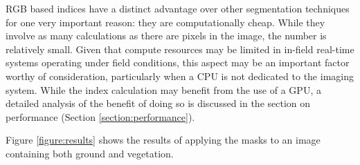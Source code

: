 \documentclass[letterpaper, notitlepage]{report}
\begin{document}
{RGB based indices have a distinct advantage over other segmentation techniques for one very important reason: they are computationally cheap. While they involve as many calculations as there are pixels in the image, the number is relatively small. Given that compute resources may be limited in in-field real-time systems operating under field conditions, this aspect may be an important factor worthy of consideration, particularly when a CPU is not dedicated to the imaging system. While the index calculation may benefit from the use of  a GPU, a detailed analysis of the benefit of doing so is discussed in the section on performance (Section \ref{section:performance}).

Figure \ref{figure:results} shows the results of applying the masks to an image containing both ground and vegetation.

}
\end{document}
